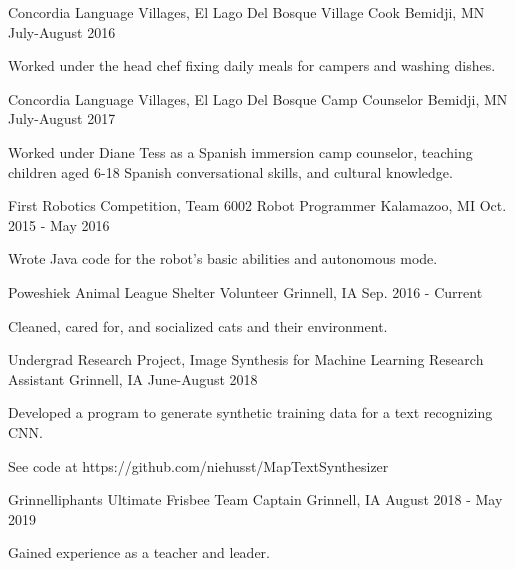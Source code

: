 \documentclass[11pt, a4paper]{awesome-cv}
\begin{document}
\begin{cventries}
\cventry
  {Concordia Language Villages, El Lago Del Bosque}
  {Village Cook}
  {Bemidji, MN}
  {July-August 2016}
  {
    \begin{cvitems}
      \item {Worked under the head chef fixing daily meals for campers and
    washing dishes.}
    \end{cvitems}
  }

  \cventry
    {Concordia Language Villages, El Lago Del Bosque}
    {Camp Counselor}
    {Bemidji, MN}
    {July-August 2017}
    {
      \begin{cvitems}
        \item {Worked under Diane Tess as a Spanish immersion camp counselor, teaching children aged 6-18 Spanish conversational skills, and cultural knowledge.}
      \end{cvitems}
    }

  \cventry
    {First Robotics Competition, Team 6002}
    {Robot Programmer}
    {Kalamazoo, MI}
    {Oct. 2015 - May 2016}
    {
      \begin{cvitems}
        \item {Wrote Java code for the robot’s basic abilities and autonomous mode.}
      \end{cvitems}
    }

  \cventry
    {Poweshiek Animal League Shelter}
    {Volunteer}
    {Grinnell, IA}
    {Sep. 2016 - Current}
    {
      \begin{cvitems}
        \item {Cleaned, cared for, and socialized cats and their environment.}
      \end{cvitems}
    }

  \cventry
    {Undergrad Research Project, Image Synthesis for Machine Learning}
    {Research Assistant}
    {Grinnell, IA}
    {June-August 2018}
    {
      \begin{cvitems}
        \item {Developed a program to generate synthetic training data for a text recognizing CNN.}
        \item{See code at https://github.com/niehusst/MapTextSynthesizer}
      \end{cvitems}
    }

  \cventry
    {Grinnelliphants Ultimate Frisbee}
    {Team Captain}
    {Grinnell, IA}
    {August 2018 - May 2019}
    {
      \begin{cvitems}
        \item {Gained experience as a teacher and leader.}
      \end{cvitems}
    }


\end{cventries}
\end{document}
